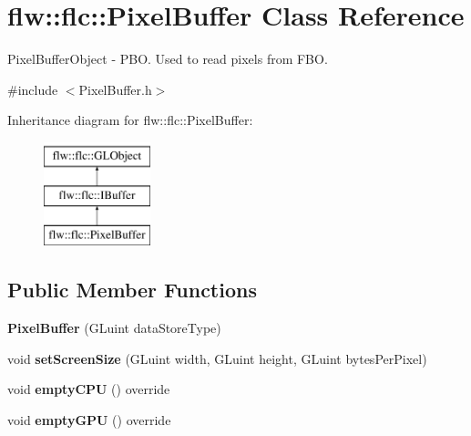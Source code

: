 \hypertarget{classflw_1_1flc_1_1PixelBuffer}{}\section{flw\+:\+:flc\+:\+:Pixel\+Buffer Class Reference}
\label{classflw_1_1flc_1_1PixelBuffer}


Pixel\+Buffer\+Object -\/ P\+BO. Used to read pixels from F\+BO.  




{\ttfamily \#include $<$Pixel\+Buffer.\+h$>$}

Inheritance diagram for flw\+:\+:flc\+:\+:Pixel\+Buffer\+:\begin{figure}[H]
\begin{center}
\leavevmode
\includegraphics[height=3.000000cm]{classflw_1_1flc_1_1PixelBuffer}
\end{center}
\end{figure}
\subsection*{Public Member Functions}
\begin{DoxyCompactItemize}
\item 
\mbox{\label{classflw_1_1flc_1_1PixelBuffer_a5408f6228db71f4c3a96a58cd7a3341a}} 
{\bfseries Pixel\+Buffer} (G\+Luint data\+Store\+Type)
\item 
\mbox{\label{classflw_1_1flc_1_1PixelBuffer_a7371cbff9e12369b1510475aa88f5363}} 
void {\bfseries set\+Screen\+Size} (G\+Luint width, G\+Luint height, G\+Luint bytes\+Per\+Pixel)
\item 
\mbox{\label{classflw_1_1flc_1_1PixelBuffer_a759e4edc39475344ede04e85d5eed2f0}} 
void {\bfseries empty\+C\+PU} () override
\item 
\mbox{\label{classflw_1_1flc_1_1PixelBuffer_afdf3b9b874d0c2abf9f5883305ec8c47}} 
void {\bfseries empty\+G\+PU} () override
\end{DoxyCompactItemize}
